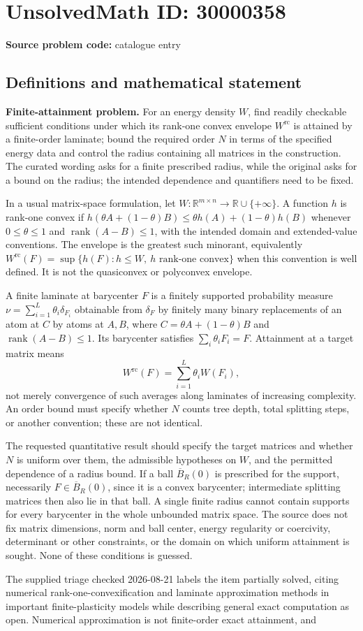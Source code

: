 \documentclass[11pt]{article}
\newcommand{\R}{\mathbb{R}}
\begin{document}
\section*{UnsolvedMath ID: 30000358}
\textbf{Source problem code:} catalogue entry
\subsection{Definitions and mathematical statement}
\textbf{Finite-attainment problem.} For an energy density \(W\), find readily checkable sufficient conditions under which its rank-one convex envelope \(W^{\mathrm{rc}}\) is attained by a finite-order laminate; bound the required order \(N\) in terms of the specified energy data and control the radius containing all matrices in the construction. The curated wording asks for a finite prescribed radius, while the original asks for a bound on the radius; the intended dependence and quantifiers need to be fixed.\par In a usual matrix-space formulation, let \(W:\R^{m\times n}\to\R\cup\{+\infty\}\). A function \(h\) is rank-one convex if \(h(\theta A+(1-\theta)B)\le\theta h(A)+(1-\theta)h(B)\) whenever \(0\le\theta\le1\) and \(\operatorname{rank}(A-B)\le1\), with the intended domain and extended-value conventions. The envelope is the greatest such minorant, equivalently \(W^{\mathrm{rc}}(F)=\sup\{h(F):h\le W,\ h\text{ rank-one convex}\}\) when this convention is well defined. It is not the quasiconvex or polyconvex envelope.\par A finite laminate at barycenter \(F\) is a finitely supported probability measure \(\nu=\sum_{i=1}^L\theta_i\delta_{F_i}\) obtainable from \(\delta_F\) by finitely many binary replacements of an atom at \(C\) by atoms at \(A,B\), where \(C=\theta A+(1-\theta)B\) and \(\operatorname{rank}(A-B)\le1\). Its barycenter satisfies \(\sum_i\theta_iF_i=F\). Attainment at a target matrix means\[W^{\mathrm{rc}}(F)=\sum_{i=1}^L\theta_iW(F_i),\] not merely convergence of such averages along laminates of increasing complexity. An order bound must specify whether \(N\) counts tree depth, total splitting steps, or another convention; these are not identical.\par The requested quantitative result should specify the target matrices and whether \(N\) is uniform over them, the admissible hypotheses on \(W\), and the permitted dependence of a radius bound. If a ball \(\overline B_R(0)\) is prescribed for the support, necessarily \(F\in\overline B_R(0)\), since it is a convex barycenter; intermediate splitting matrices then also lie in that ball. A single finite radius cannot contain supports for every barycenter in the whole unbounded matrix space. The source does not fix matrix dimensions, norm and ball center, energy regularity or coercivity, determinant or other constraints, or the domain on which uniform attainment is sought. None of these conditions is guessed.\par The supplied triage checked 2026-08-21 labels the item partially solved, citing numerical rank-one-convexification and laminate approximation methods in important finite-plasticity models while describing general exact computation as open. Numerical approximation is not finite-order exact attainment, and 
\end{document}

